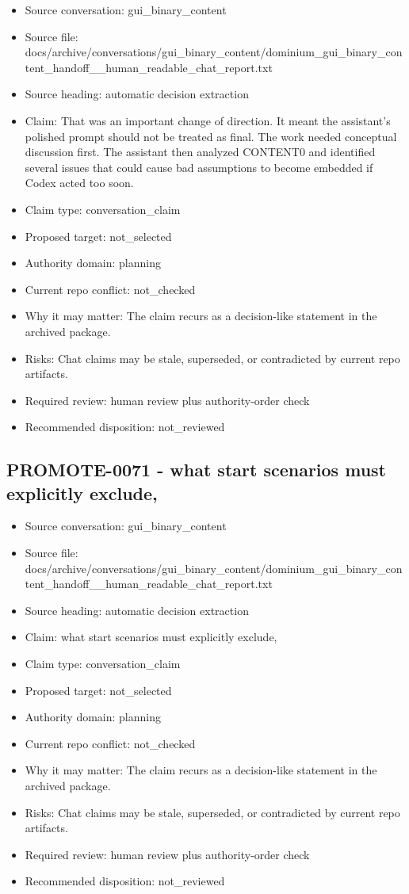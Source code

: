\documentclass[11pt,a4paper]{report}
\begin{document}
\begin{itemize}
\item Source conversation: gui\_binary\_content
\item Source file: docs/archive/conversations/gui\_binary\_content/dominium\_gui\_binary\_content\_handoff\_\_human\_readable\_chat\_report.txt
\item Source heading: automatic decision extraction
\item Claim: That was an important change of direction. It meant the assistant's polished prompt should not be treated as final. The work needed conceptual discussion first. The assistant then analyzed CONTENT0 and identified several issues that could cause bad assumptions to become embedded if Codex acted too soon.
\item Claim type: conversation\_claim
\item Proposed target: not\_selected
\item Authority domain: planning
\item Current repo conflict: not\_checked
\item Why it may matter: The claim recurs as a decision-like statement in the archived package.
\item Risks: Chat claims may be stale, superseded, or contradicted by current repo artifacts.
\item Required review: human review plus authority-order check
\item Recommended disposition: not\_reviewed
\end{itemize}

\subsection{PROMOTE-0071 - what start scenarios must explicitly exclude,}

\begin{itemize}
\item Source conversation: gui\_binary\_content
\item Source file: docs/archive/conversations/gui\_binary\_content/dominium\_gui\_binary\_content\_handoff\_\_human\_readable\_chat\_report.txt
\item Source heading: automatic decision extraction
\item Claim: what start scenarios must explicitly exclude,
\item Claim type: conversation\_claim
\item Proposed target: not\_selected
\item Authority domain: planning
\item Current repo conflict: not\_checked
\item Why it may matter: The claim recurs as a decision-like statement in the archived package.
\item Risks: Chat claims may be stale, superseded, or contradicted by current repo artifacts.
\item Required review: human review plus authority-order check
\item Recommended disposition: not\_reviewed
\end{itemize}
\end{document}
